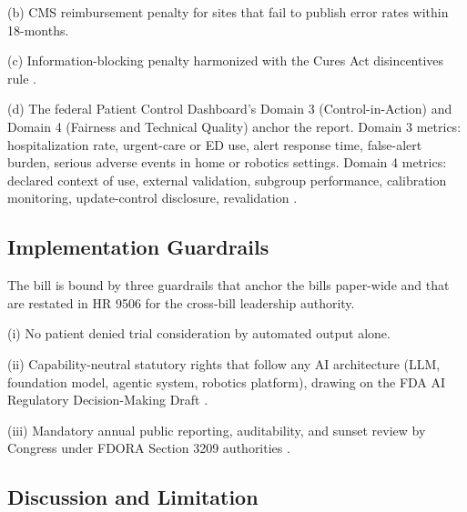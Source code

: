(b) CMS reimbursement penalty for sites that fail to publish error
rates within 18-months.

(c) Information-blocking penalty harmonized with the Cures Act
disincentives rule \cite{federal_register_info_blocking_disincentives_2024}.

(d) The federal Patient Control Dashboard's Domain 3 (Control-in-Action) and Domain 4 (Fairness and Technical Quality) anchor the
report. Domain 3 metrics: hospitalization rate, urgent-care or ED
use, alert response time, false-alert burden, serious adverse events
in home or robotics settings. Domain 4 metrics: declared context of
use, external validation, subgroup performance, calibration
monitoring, update-control disclosure, revalidation \cite{rocque2025remote_symptom_monitoring,
gonzalez2025bayesian_urgent_care_nsclc,
dronca2026cancer_care_beyond_walls, target2025robotic_bronchoscopy,
fda_ai_regulatory_decision_draft_2025, vorontsov2024virchow}.

\subsection{Implementation Guardrails}

\hspace{0.5cm} The bill is bound by three guardrails that anchor the bills paper-wide and that are restated in HR 9506 for the cross-bill leadership
authority.

(i) No patient denied trial consideration by automated output
alone.

(ii) Capability-neutral statutory rights that follow any AI
architecture (LLM, foundation model, agentic system, robotics
platform), drawing on the FDA AI Regulatory Decision-Making Draft
\cite{fda_ai_regulatory_decision_draft_2025}.

(iii) Mandatory annual public reporting, auditability, and sunset
review by Congress under FDORA Section 3209 authorities
\cite{rank4_fdora_fda_modernization_2022}.

\subsection{Discussion and Limitation}

